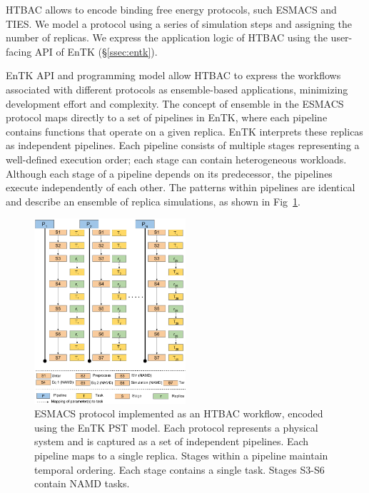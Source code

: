 HTBAC %
allows to %
encode binding free energy protocols, such ESMACS and TIES\@. We model a
protocol using a series of simulation steps and assigning the number of
replicas. We express the application logic of HTBAC using
the user-facing API %
of EnTK (\S\ref{ssec:entk}). 

EnTK %
API and programming model allow HTBAC to express the workflows associated
with different protocols as ensemble-based applications,
minimizing development effort and complexity. 
The concept of %
ensemble in the ESMACS  protocol maps directly to a set of pipelines in EnTK, where
each pipeline contains functions that operate on a given replica. EnTK
interprets these replicas as independent pipelines. Each pipeline consists of
multiple stages representing a well-defined execution order; each stage can
contain heterogeneous workloads. Although each stage of a pipeline depends on
its predecessor, the pipelines execute independently of each other. The
patterns within pipelines are identical and describe an ensemble of replica
simulations, as shown in Fig~\ref{figure:HTBAC}.

\begin{figure}
\centering
  \includegraphics[width=0.5\textwidth]{FIGURES/HTBAC_Workflow_ESMACS.pdf}
  \caption{ESMACS protocol implemented as an HTBAC workflow, encoded using
  the EnTK PST model. Each protocol represents a physical system and is
  captured as a set of independent pipelines. Each pipeline maps to a single
  replica. Stages within a pipeline maintain temporal ordering. Each stage
  contains a single task. Stages S3-S6 contain NAMD
  tasks.}\label{figure:HTBAC}
\end{figure}

